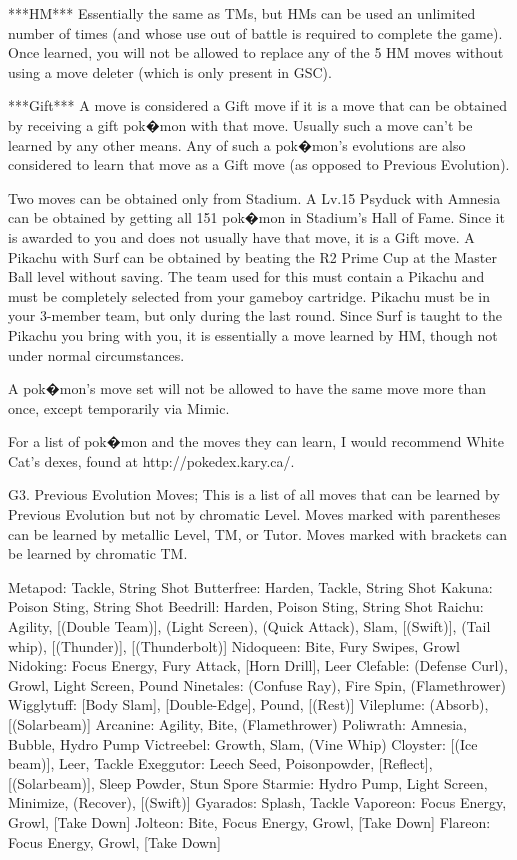 \documentclass[reprint, aps, prl, paper=A4]{revtex4-1}
\begin{document}
***HM***
Essentially the same as TMs, but HMs can be used an unlimited number of times (and whose use
out of battle is required to complete the game). Once learned, you will not be allowed to
replace any of the 5 HM moves without using a move deleter (which is only present in GSC).

***Gift***
A move is considered a Gift move if it is a move that can be obtained by receiving a gift
pok�mon with that move. Usually such a move can't be learned by any other means. Any of such a
pok�mon's evolutions are also considered to learn that move as a Gift move (as opposed to
Previous Evolution).

Two moves can be obtained only from Stadium. A Lv.15 Psyduck with Amnesia can be obtained by
getting all 151 pok�mon in Stadium's Hall of Fame. Since it is awarded to you and does not
usually have that move, it is a Gift move. A Pikachu with Surf can be obtained by beating the
R2 Prime Cup at the Master Ball level without saving. The team used for this must contain a
Pikachu and must be completely selected from your gameboy cartridge. Pikachu must be in your
3-member team, but only during the last round. Since Surf is taught to the Pikachu you bring
with you, it is essentially a move learned by HM, though not under normal circumstances.

A pok�mon's move set will not be allowed to have the same move more than once, except
temporarily via Mimic.

For a list of pok�mon and the moves they can learn, I would recommend White Cat's dexes, found
at http://pokedex.kary.ca/.


G3. Previous Evolution Moves;
This is a list of all moves that can be learned by Previous Evolution but not by chromatic
Level. Moves marked with parentheses can be learned by metallic Level, TM, or Tutor. Moves
marked with brackets can be learned by chromatic TM.

Metapod: Tackle, String Shot
Butterfree: Harden, Tackle, String Shot
Kakuna: Poison Sting, String Shot
Beedrill: Harden, Poison Sting, String Shot
Raichu: Agility, [(Double Team)], (Light Screen), (Quick Attack), Slam, [(Swift)], (Tail whip),
           [(Thunder)], [(Thunderbolt)]
Nidoqueen: Bite, Fury Swipes, Growl
Nidoking: Focus Energy, Fury Attack, [Horn Drill], Leer
Clefable: (Defense Curl), Growl, Light Screen, Pound
Ninetales: (Confuse Ray), Fire Spin, (Flamethrower)
Wigglytuff: [Body Slam], [Double-Edge], Pound, [(Rest)]
Vileplume: (Absorb), [(Solarbeam)]
Arcanine: Agility, Bite, (Flamethrower)
Poliwrath: Amnesia, Bubble, Hydro Pump
Victreebel: Growth, Slam, (Vine Whip)
Cloyster: [(Ice beam)], Leer, Tackle
Exeggutor: Leech Seed, Poisonpowder, [Reflect], [(Solarbeam)], Sleep Powder, Stun Spore
Starmie: Hydro Pump, Light Screen, Minimize, (Recover), [(Swift)]
Gyarados: Splash, Tackle
Vaporeon: Focus Energy, Growl, [Take Down]
Jolteon: Bite, Focus Energy, Growl, [Take Down]
Flareon: Focus Energy, Growl, [Take Down]
\end{document}

